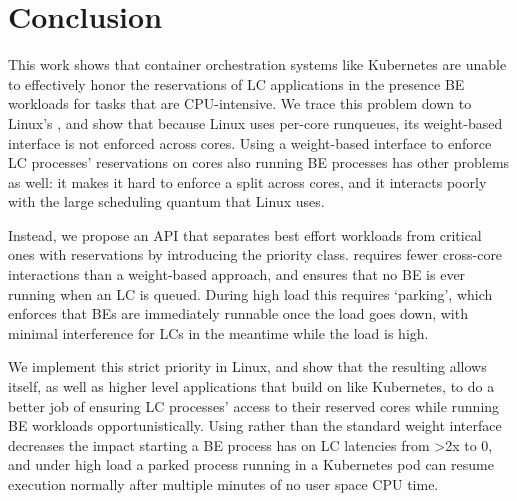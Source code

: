 \section{Conclusion}

This work shows that container orchestration systems like Kubernetes are unable
to effectively honor the reservations of LC applications in the presence BE
workloads for tasks that are CPU-intensive. We trace this problem down to
Linux's \cgroups{}, and show that because Linux uses per-core runqueues, its
weight-based interface is not enforced across cores. Using a weight-based
interface to enforce LC processes' reservations on cores also running BE
processes has other problems as well: it makes it hard to enforce a split across
cores, and it interacts poorly with the large scheduling quantum that Linux
uses.

Instead, we propose an API that separates best effort workloads from critical
ones with reservations by introducing the \beclass{} priority class. \beclass{}
requires fewer cross-core interactions than a weight-based approach, and ensures
that no BE is ever running when an LC is queued. During high load this requires
`parking', which enforces that BEs are immediately runnable once the load goes
down, with minimal interference for LCs in the meantime while the load is high.

We implement this strict priority in Linux, and show that the resulting
\schedbe{} allows \cgroups{} itself, as well as higher level applications that
build on \cgroups{} like Kubernetes, to do a better job of ensuring LC
processes' access to their reserved cores while running BE workloads
opportunistically. Using \schedbe{} rather than the standard \cgroups{} weight
interface decreases the impact starting a BE process has on LC latencies from
>2x to 0, and under high load a parked \schedbe{} process running in a
Kubernetes pod can resume execution normally after multiple minutes of no user
space CPU time.

